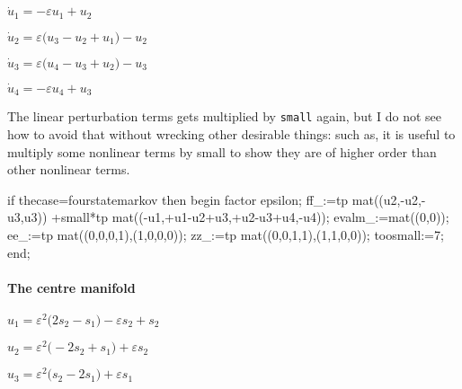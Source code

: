 \documentclass[11pt,a5paper]{article}
\begin{document}
\begin{math}
\dot u_{1}=-\varepsilon  u_{1}+u_{2}
\end{math}\par

\begin{math}
\dot u_{2}=\varepsilon  \big(u_{3}-u_{2}+u_{1}\big)-u_{2}
\end{math}\par

\begin{math}
\dot u_{3}=\varepsilon  \big(u_{4}-u_{3}+u_{2}\big)-u_{3}
\end{math}\par

\begin{math}
\dot u_{4}=-\varepsilon  u_{4}+u_{3}
\end{math}\par

The linear perturbation terms gets multiplied by \verb|small| again, but I do not see how to avoid that without wrecking other desirable things: such as, it is useful to multiply some nonlinear terms by small to show they are of higher order than other nonlinear terms. 

\begin{reduce}
if thecase=fourstatemarkov then begin
factor epsilon;
ff_:=tp mat((u2,-u2,-u3,u3))
+small*tp mat((-u1,+u1-u2+u3,+u2-u3+u4,-u4));
evalm_:=mat((0,0));
ee_:=tp mat((0,0,0,1),(1,0,0,0));
zz_:=tp mat((0,0,1,1),(1,1,0,0));
toosmall:=7; 
end;
\end{reduce}


\paragraph{The centre manifold}

\begin{math}
u_{1}=\varepsilon ^{2} \big(2 s_{2}-s_{1}\big)-
\varepsilon  s_{2}+s_{2}
\end{math}\par

\begin{math}
u_{2}=\varepsilon ^{2} \big(-2 s_{2}+s_{1}\big)+
\varepsilon  s_{2}
\end{math}\par

\begin{math}
u_{3}=\varepsilon ^{2} \big(s_{2}-2 s_{1}\big)+
\varepsilon  s_{1}
\end{math}\par
\end{document}
